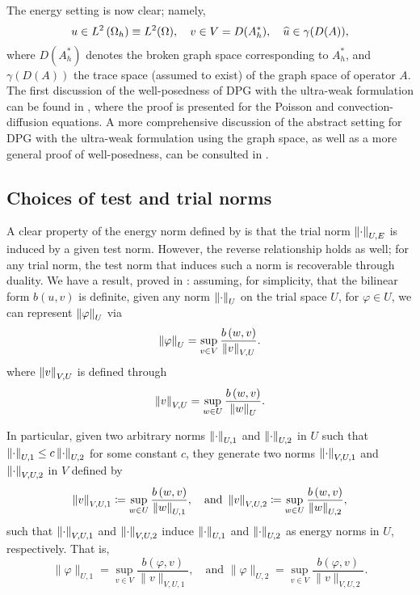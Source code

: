 The energy setting is now clear; namely,
\[
u\in L^2\LRp{\Oh} \equiv L^2(\Omega), \quad v\in V=D(A^*_h), \quad
\widehat{u}\in \gamma(D(A)),
\]
where $D(A_h^*)$ denotes the broken graph space corresponding to $A_h^*$,
and $\gamma(D(A))$ the trace space (assumed to exist) of the graph space of
operator $A$. The first discussion of the well-posedness of DPG with the ultra-weak formulation can be found in \cite{analysisDPG}, where the proof is presented for the Poisson and convection-diffusion equations. A more comprehensive discussion of the abstract setting for DPG with the ultra-weak formulation using the graph space, as well as a more general proof of well-posedness, can be consulted in \cite{Bui-ThanhDemkowiczGhattas11b}. 

\subsection{Choices of test and trial norms}

A clear property of the energy norm defined by  is that the trial norm $\nor{\cdot}_{U,E}$ is induced by a given test norm. However, the reverse relationship holds as well; for any trial norm, the test norm that induces such a norm is recoverable through duality. We have a result, proved in \cite{Bui-ThanhDemkowiczGhattas11a}: assuming, for simplicity, that the bilinear form $b(u,v)$ is definite, given any norm $\nor{\cdot}_{U}$ on the trial space $U$, for $\varphi \in U$, we can represent $\nor{\varphi}_{U}$ via
\[
\nor{\varphi}_{U} = \sup_{v \in V}\frac{b\LRp{w,v}}{\nor{v}_{V,U}}.
\]
where $\nor{v}_{V,U}$ is defined through
\[
\nor{v}_{V,U} = \sup_{w \in U}\frac{b\LRp{w,v}}{\nor{w}_{U}}.
\]

In particular, given two arbitrary norms $\nor{\cdot}_{U,1}$ and $\nor{\cdot}_{U,2}$ in $U$
such that $\nor{\cdot}_{U,1} \le c \nor{\cdot}_{U,2}$ for some constant
$c$, they generate two norms $\nor{\cdot}_{V,U,1}$ and
$\nor{\cdot}_{V,U,2}$ in $V$ defined by
\[
\nor{v}_{V,U,1} \coloneqq \sup_{w \in U}\frac{b\LRp{w,v}}{\nor{w}_{U,1}}, \quad
\text{and }\nor{v}_{V,U,2} \coloneqq \sup_{w \in U}\frac{b\LRp{w,v}}{\nor{w}_{U,2}},
\]
such that $\nor{\cdot}_{V,U,1}$ and $\nor{\cdot}_{V,U,2}$ induce
$\nor{\cdot}_{U,1}$ and $\nor{\cdot}_{U,2}$ as energy
norms in $U$, respectively. That is,
\[
\|\varphi\|_{U,1} = \sup_{v\in V}
\frac{b(\varphi,v)}{\|v\|_{V,U,1}}, \quad \text{and }\|\varphi\|_{U,2} = \sup_{v\in V}
\frac{b(\varphi,v)}{\|v\|_{V,U,2}}.
\]

